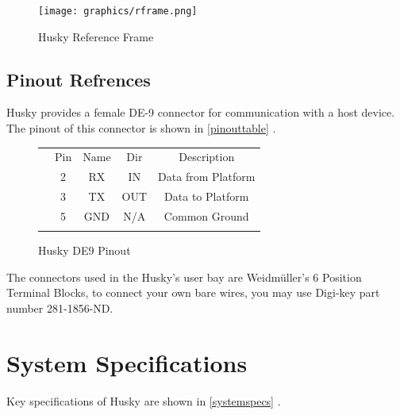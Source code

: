\documentclass[]{clearpath-latex/clearpath-manual}
\begin{document}
 \begin{figure}[h]
	\texttt{[image: graphics/rframe.png]}
	\caption{Husky Reference Frame}
	\label{rframe}
 \end{figure}

\subsection{Pinout Refrences}

Husky provides a female DE-9 connector for communication with a host device. The pinout of this connector is shown in \autoref{pinouttable} .


\begin{figure}[h]
	\centering
	\begin{tabular}{  >{\centering\arraybackslash}m{.4\linewidth} c c c c }
	\multirow{5}{*}{\texttt{[image: graphics/pinout.png]}} \\  \cline{2-5}
	& \cellcolor{lightgrey}  Pin & \cellcolor{lightgrey}  Name & \cellcolor{lightgrey}  Dir & \cellcolor{lightgrey}  Description \\ \cline{2-5}
	& 2 & RX & IN & Data from Platform\\  \cline{2-5}
	& 3 & TX & OUT & Data to Platform\\ \cline{2-5}
	& 5 & GND & N/A & Common Ground\\ \cline{2-5}
	\end{tabular}
	\newline
	\caption{Husky DE9 Pinout}
	\label{pinouttable}

\end{figure}

The connectors used in the Husky's user bay  are Weidmüller's 6 Position Terminal Blocks, to connect your own bare wires, you may use Digi-key part number 281-1856-ND.

\newpage

\section{System Specifications}

Key specifications of Husky are shown in \autoref{systemspecs} .
\end{document}
